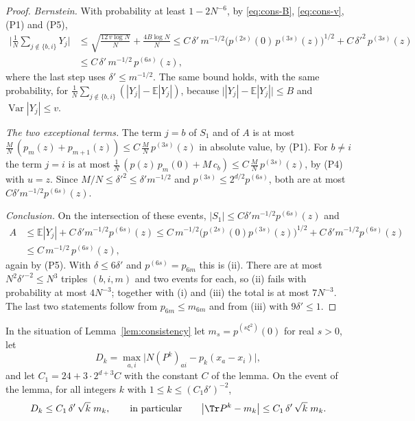 \begin{proof}
\emph{Bernstein.} With probability at least $1-2N^{-6}$, by \eqref{eq:cons-B}, \eqref{eq:cons-v}, (P1) and (P5),
\[
\begin{aligned}
\Big|\frac1N\sum_{j\notin\{b,i\}}Y_j\Big|&\le\sqrt{\frac{12\,v\log N}{N}}+\frac{4B\log N}{N}\le C\,\delta'\,m^{-1/2}\big(p^{(2s)}(0)\,p^{(3s)}(z)\big)^{1/2}+C\,\delta'^2\,p^{(3s)}(z)\\
&\le C\,\delta'\,m^{-1/2}\,p^{(6s)}(z),
\end{aligned}
\]
where the last step uses $\delta'\le m^{-1/2}$. The same bound holds, with the same probability, for $\frac1N\sum_{j\notin\{b,i\}}(|Y_j|-\mathbb E|Y_j|)$, because $\big||Y_j|-\mathbb E|Y_j|\big|\le B$ and $\operatorname{Var}|Y_j|\le v$.

\emph{The two exceptional terms.} The term $j=b$ of $S_1$ and of $A$ is at most $\frac MN\,(p_m(z)+p_{m+1}(z))\le C\,\frac MN\,p^{(3s)}(z)$ in absolute value, by (P1). For $b\ne i$ the term $j=i$ is at most $\frac1N\,(p(z)\,p_m(0)+M\,c_b)\le C\,\frac MN\,p^{(3s)}(z)$, by (P4) with $u=z$. Since $M/N\le\delta'^2\le\delta'm^{-1/2}$ and $p^{(3s)}\le2^{d/2}p^{(6s)}$, both are at most $C\delta'm^{-1/2}p^{(6s)}(z)$.

\emph{Conclusion.} On the intersection of these events, $|S_1|\le C\delta'm^{-1/2}p^{(6s)}(z)$ and
\[
\begin{aligned}
A&\le\mathbb E|Y_j|+C\,\delta'm^{-1/2}p^{(6s)}(z)\le C\,m^{-1/2}\big(p^{(2s)}(0)p^{(3s)}(z)\big)^{1/2}+C\,\delta'm^{-1/2}p^{(6s)}(z)\\
&\le C\,m^{-1/2}\,p^{(6s)}(z),
\end{aligned}
\]
again by (P5). With $\delta\le6\delta'$ and $p^{(6s)}=p_{6m}$ this is (ii). There are at most $N^2\delta'^{-2}\le N^3$ triples $(b,i,m)$ and two events for each, so (ii) fails with probability at most $4N^{-3}$; together with (i) and (iii) the total is at most $7N^{-3}$. The last two statements follow from $p_{6m}\le m_{6m}$ and from (iii) with $9\delta'\le1$.
\end{proof}

\begin{theorem}\label{thm:kernel}
In the situation of Lemma~\ref{lem:consistency} let $m_s=p^{(s\xi^2)}(0)$ for real $s>0$, let
\[
D_k=\max_{a,i}\big|N(P^k)_{ai}-p_k(x_a-x_i)\big|,
\]
and let $C_1=24+3\cdot2^{d+3}C$ with the constant $C$ of the lemma. On the event of the lemma, for all integers $k$ with $1\le k\le(C_1\delta')^{-2}$,
\[
D_k\le C_1\,\delta'\,\sqrt k\;m_k,\qquad\text{in particular}\qquad\big|\Tr P^k-m_k\big|\le C_1\,\delta'\,\sqrt k\;m_k .
\]
\end{theorem}


